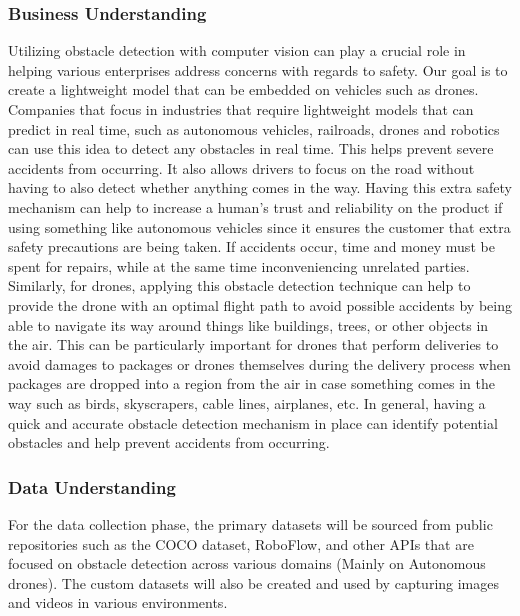 \documentclass[stu,12pt,floatsintext]{apa7}
\begin{document}
\subsubsection{Business Understanding}
Utilizing obstacle detection with computer vision can play a crucial role in helping various enterprises address concerns with regards to safety. Our goal is to create a lightweight model that can be embedded on vehicles such as drones. Companies that focus in industries that require lightweight models that can predict in real time, such as autonomous vehicles, railroads, drones and robotics can use this idea to detect any obstacles in real time. This helps prevent severe accidents from occurring. It also allows drivers to focus on the road without having to also detect whether anything comes in the way. Having this extra safety mechanism can help to increase a human's trust and reliability on the product if using something like autonomous vehicles since it ensures the customer that extra safety precautions are being taken. If accidents occur, time and money must be spent for repairs, while at the same time inconveniencing unrelated parties. Similarly, for drones, applying this obstacle detection technique can help to provide the drone with an optimal flight path to avoid possible accidents by being able to navigate its way around things like buildings, trees, or other objects in the air. This can be particularly important for drones that perform deliveries to avoid damages to packages or drones themselves during the delivery process when packages are dropped into a region from the air in case something comes in the way such as birds, skyscrapers, cable lines, airplanes, etc. In general, having a quick and accurate obstacle detection mechanism in place can identify potential obstacles and help prevent accidents from occurring.


\subsubsection{Data Understanding}
For the data collection phase, the primary datasets will be sourced from public repositories such as the COCO dataset, RoboFlow, and other APIs that are focused on obstacle detection across various domains (Mainly on Autonomous drones). The custom datasets will also be created and used by capturing images and videos in various environments.
\end{document}
